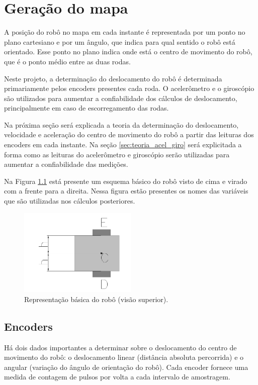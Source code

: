\chapter{Geração do mapa}

A posição do robô no mapa em cada instante é representada por um ponto no plano cartesiano e por um ângulo, que indica para qual sentido o robô está orientado. Esse ponto no plano indica onde está o centro de movimento do robô, que é o ponto médio entre as duas rodas.

Neste projeto, a determinação do deslocamento do robô é determinada primariamente pelos encoders presentes cada roda. O acelerômetro e o giroscópio são utilizados para aumentar a confiabilidade dos cálculos de deslocamento, principalmente em caso de escorregamento das rodas.

Na próxima seção será explicada a teoria da determinação do deslocamento, velocidade e aceleração do centro de movimento do robô a partir das leituras dos encoders em cada instante. Na seção \ref{sec:teoria_acel_giro} será explicitada a forma como as leituras do acelerômetro e giroscópio serão utilizadas para aumentar a confiabilidade das medições.

Na Figura \ref{fig:robo} está presente um esquema básico do robô visto de cima e virado com a frente para a direita. Nessa figura estão presentes os nomes das variáveis que são utilizadas nos cálculos posteriores.

\begin{figure}[H]
  \centering
  \includegraphics[width=0.5\textwidth, keepaspectratio]{./figuras/robo/robo.png}
  \caption{Representação básica do robô (visão superior).}
  \label{fig:robo}
\end{figure}

\section{Encoders}

Há dois dados importantes a determinar sobre o deslocamento do centro de movimento do robô: o deslocamento linear (distância absoluta percorrida) e o angular (variação do ângulo de orientação do robô). Cada encoder fornece uma medida de contagem de pulsos por volta a cada intervalo de amostragem. 

